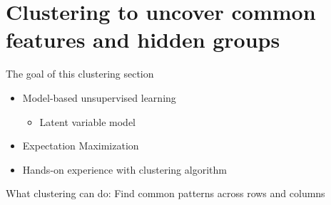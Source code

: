 \documentclass[
  ignorenonframetext,
  aspectratio=169]{beamer}
\providecommand{\tightlist}{%
  \setlength{\itemsep}{0pt}\setlength{\parskip}{0pt}}
\begin{document}
\hypertarget{clustering-to-uncover-common-features-and-hidden-groups}{%
\section{Clustering to uncover common features and hidden
groups}\label{clustering-to-uncover-common-features-and-hidden-groups}}

\begin{frame}{The goal of this clustering section}
\protect\hypertarget{the-goal-of-this-clustering-section}{}
\begin{itemize}
\item
  Model-based unsupervised learning

  \begin{itemize}
  \tightlist
  \item
    Latent variable model
  \end{itemize}
\item
  Expectation Maximization
\item
  Hands-on experience with clustering algorithm
\end{itemize}

\scriptsize

\normalsize
\end{frame}

\begin{frame}{What clustering can do: Find common patterns across rows
and columns}
\protect\hypertarget{what-clustering-can-do-find-common-patterns-across-rows-and-columns}{}
\scriptsize


\normalsize

\scriptsize


\normalsize
\end{frame}
\end{document}
